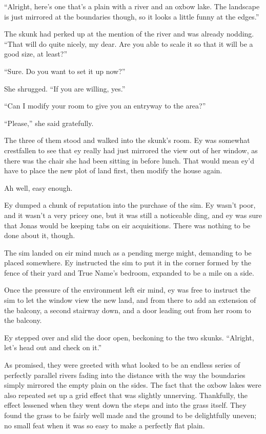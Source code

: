 ``Alright, here's one that's a plain with a river and an oxbow lake. The landscape is just mirrored at the boundaries though, so it looks a little funny at the edges.''

The skunk had perked up at the mention of the river and was already nodding. ``That will do quite nicely, my dear. Are you able to scale it so that it will be a good size, at least?''

``Sure. Do you want to set it up now?''

She shrugged. ``If you are willing, yes.''

``Can I modify your room to give you an entryway to the area?''

``Please,'' she said gratefully.

The three of them stood and walked into the skunk's room. Ey was somewhat crestfallen to see that ey really had just mirrored the view out of her window, as there was the chair she had been sitting in before lunch. That would mean ey'd have to place the new plot of land first, then modify the house again.

Ah well, easy enough.

Ey dumped a chunk of reputation into the purchase of the sim. Ey wasn't poor, and it wasn't a very pricey one, but it was still a noticeable ding, and ey was sure that Jonas would be keeping tabs on eir acquisitions. There was nothing to be done about it, though.

The sim landed on eir mind much as a pending merge might, demanding to be placed somewhere. Ey instructed the sim to put it in the corner formed by the fence of their yard and True Name's bedroom, expanded to be a mile on a side.

Once the pressure of the environment left eir mind, ey was free to instruct the sim to let the window view the new land, and from there to add an extension of the balcony, a second stairway down, and a door leading out from her room to the balcony.

Ey stepped over and slid the door open, beckoning to the two skunks. ``Alright, let's head out and check on it.''

As promised, they were greeted with what looked to be an endless series of perfectly parallel rivers fading into the distance with the way the boundaries simply mirrored the empty plain on the sides. The fact that the oxbow lakes were also repeated set up a grid effect that was slightly unnerving. Thankfully, the effect lessened when they went down the steps and into the grass itself. They found the grass to be fairly well made and the ground to be delightfully uneven; no small feat when it was so easy to make a perfectly flat plain.

